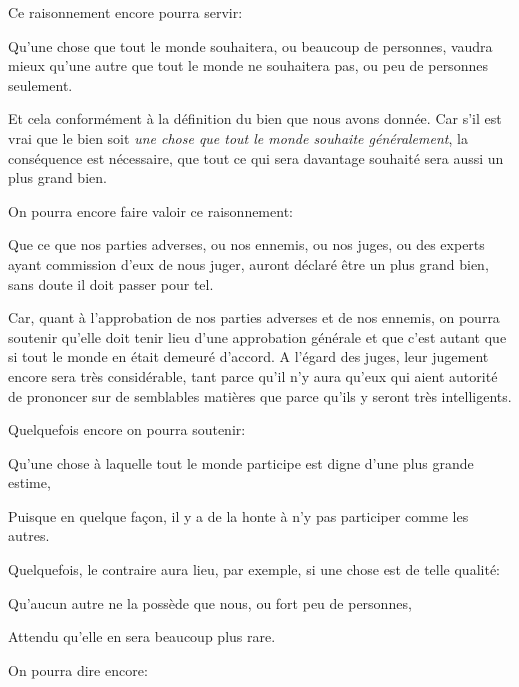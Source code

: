 Ce raisonnement encore pourra servir:

\begin{lieu}
	Qu'une chose que tout le monde souhaitera, ou beaucoup de personnes, vaudra mieux qu'une autre que tout le monde ne
	souhaitera pas, ou peu de personnes seulement.
\end{lieu}

Et cela conformément à la définition du bien que nous avons donnée. Car s'il est vrai que le bien soit \emph{une chose
que tout le monde souhaite généralement}, la conséquence est nécessaire, que tout ce qui sera davantage souhaité sera
aussi un plus grand bien.

\bigbreak

On pourra encore faire valoir ce raisonnement:

\begin{lieu}
	Que ce que nos parties adverses, ou nos ennemis, ou nos juges, ou des experts ayant commission d'eux de nous juger,
	auront déclaré être un plus grand bien, sans doute il doit passer pour tel.
\end{lieu}

Car, quant à l'approbation de nos parties adverses et de nos ennemis, on pourra soutenir qu'elle doit tenir lieu d'une
approbation générale et que c'est autant que si tout le monde en était demeuré d'accord. A l'égard des juges, leur jugement
encore sera très considérable, tant parce qu'il n'y aura qu'eux qui aient autorité de prononcer sur de semblables matières
que parce qu'ils y seront très intelligents.

\bigbreak

Quelquefois encore on pourra soutenir:

\begin{lieu}
	Qu'une chose à laquelle tout le monde participe est digne d'une plus grande estime,
\end{lieu}

Puisque en quelque façon, il y a de la honte à n'y pas participer comme les autres.

Quelquefois, le contraire aura lieu, par exemple, si une chose est de telle qualité:

\begin{lieu}
	Qu'aucun autre ne la possède que nous, ou fort peu de personnes,
\end{lieu}

Attendu qu'elle en sera beaucoup plus rare.

\bigbreak

On pourra dire encore:

